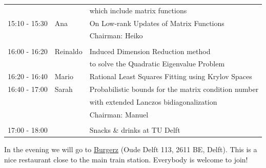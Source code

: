 \documentclass{article}
\begin{document}
\begin{table}[h]
\begin{tabular}{lll}
                  & & which include matrix functions\\ [0.5ex]
15:10 - 15:30 & Ana & On Low-rank Updates of Matrix Functions\\ [0.5ex]
& & \hfill \small{Chairman: Heiko}  \\
\hline \\ [-1.5ex]
16:00 - 16:20 & Reinaldo & Induced Dimension Reduction method \\
            & & to solve the Quadratic Eigenvalue Problem \\ [0.5ex]
16:20 - 16:40 & Mario & Rational Least Squares Fitting using Krylov Spaces\\ [0.5ex]
16:40 - 17:00 & Sarah & Probabilistic bounds for the matrix condition number \\
                    & & with extended Lanczos bidiagonalization\\ [0.5ex]
& & \hfill \small{Chairman: Manuel}\\
\hline \\ [-1.5ex]
17:00 - 18:00 & & Snacks \& drinks at TU Delft
\end{tabular}
\end{table}

In the evening we will go to \href{http://www.burgerz.nl/en/contact/delft}{Burgerz} (Oude Delft 113, 2611 BE, Delft). This is a nice restaurant close to the main train station. Everybody is welcome to join!
\end{document}
